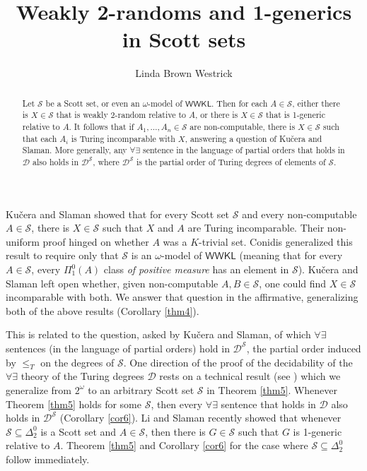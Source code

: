 \documentclass{amsart}
\title{Weakly 2-randoms and 1-generics in Scott sets}
\author[L.\ B.\ Westrick]{Linda Brown Westrick}
\newcommand{\cS}{\mathcal S}
\newcommand{\cDS}{\mathcal D^\cS}
\newcommand{\WWKL}{\mathsf{WWKL}}
\begin{document}
\begin{abstract}
  Let $\mathcal S$ be a Scott set, or even an
  $\omega$-model of $\mathsf{WWKL}$. Then 
for each $A\in \cS$, either there is $X \in \cS$ that is
  weakly 2-random relative to $A$, or 
there is $X\in \cS$ that is 1-generic relative to $A$.
It follows that 
if $A_1,\dots, A_n \in \cS$ are non-computable,
  there is $X \in \mathcal S$ such that each $A_i$ is
  Turing incomparable with $X$, answering
a question
  of Ku\v{c}era and Slaman.  
More generally,
any $\forall\exists$ sentence in the language of 
partial orders that holds in 
$\mathcal D$ also holds in $\cDS$,
where $\cDS$ is the partial order of Turing degrees 
of elements of $\cS$.
\end{abstract}

\maketitle

Ku\v{c}era and Slaman \cite{kuceraslaman} 
showed that for every Scott set $\cS$ and every
non-computable $A \in \cS$, there is $X \in \cS$ such that $X$ and $A$
are Turing incomparable.
Their non-uniform proof hinged
on whether $A$ was a $K$-trivial set.  
Conidis \cite{conidis} generalized this result to require only that
$\cS$ is an $\omega$-model
of $\WWKL$  (meaning that
for every $A\in \cS$, every $\Pi^0_1(A)$ class
\emph{of positive measure} has an element in $\cS$).
Ku\v{c}era and Slaman left open whether,
given non-computable $A, B \in \cS$, one could find $X \in \cS$
incomparable with both.  We answer that question in the affirmative, 
generalizing both of the above results 
(Corollary \ref{thm4}).

This is related to the question, asked by Ku\v{c}era and Slaman, 
of which $\forall\exists$ sentences 
(in the language of partial orders) hold in $\cDS$, the partial 
order induced by $\leq_T$ on the degrees of
$\cS$.  
One direction of the 
proof of the decidability of the
$\forall\exists$ theory of the Turing degrees $\mathcal D$ 
rests on a technical result (see \cite[Theorem II.4.11]{lerman}) 
which we generalize from $2^\omega$
to an arbitrary Scott set $\cS$ in Theorem \ref{thm5}.  
Whenever Theorem \ref{thm5} holds for some $\cS$, then every 
$\forall\exists$ sentence that holds in $\mathcal D$ also 
holds in $\cDS$ (Corollary \ref{cor6}).  
Li and Slaman \cite{liwei} recently showed that
whenever $\cS\subseteq \Delta^0_2$ is a Scott set and $A\in \cS$, 
then there is $G \in \cS$ such that $G$ is 1-generic relative to $A$. 
Theorem \ref{thm5} and Corollary \ref{cor6}
for the case where
$\cS \subseteq \Delta^0_2$ follow immediately.
\end{document}

